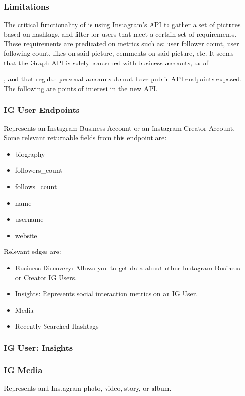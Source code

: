 \subsubsection{Limitations}
The critical functionality of \serviceName is using Instagram's API to gather a set of pictures based on hashtags,
and filter for users that meet a certain set of requirements. These requirements are predicated on metrics such as:
user follower count, user following count, likes on said picture, comments on said picture, etc. It seems that 
the Graph API is solely concerned with business accounts, as of \date{\today}, and that regular personal accounts
do not have public API endpoints exposed. The following are points of interest in the new API.

\subsubsection{IG User Endpoints}
Represents an Instagram Business Account or an Instagram Creator Account. Some relevant returnable fields from
this endpoint are:
\begin{itemize}
    \item biography
    \item followers\_count
    \item follows\_count
    \item name
    \item username
    \item website
\end{itemize}

Relevant edges are:
\begin{itemize}
    \item Business Discovery: Allows you to get data about other Instagram Business or Creator IG Users.
    \item Insights: Represents social interaction metrics on an IG User. 
    \item Media
    \item Recently Searched Hashtags
\end{itemize}


\subsubsection{IG User: Insights}

\subsubsection{IG Media}
Represents and Instagram photo, video, story, or album.

